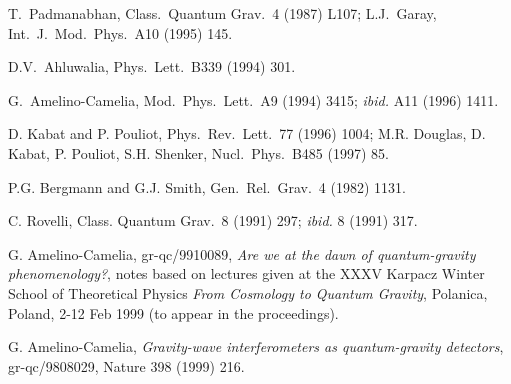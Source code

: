 \begin{thebibliography}{99}
 T.~Padmanabhan,
Class.~Quantum Grav.~4 (1987) L107;
L.J.~Garay, Int.~J.~Mod.~Phys.~A10 (1995) 145.

 D.V.~Ahluwalia, 
Phys.~Lett.~B339 (1994) 301.

G.~Amelino-Camelia,
Mod.~Phys.~Lett.~A9 (1994) 3415; {\it ibid.} A11 (1996) 1411.

 D. Kabat and P. Pouliot, 
Phys.~Rev.~Lett.~77 (1996) 1004;
M.R. Douglas, D. Kabat, P. Pouliot, S.H. Shenker,
Nucl.~Phys.~B485 (1997) 85.

 P.G. Bergmann and G.J. Smith, 
Gen.~Rel.~Grav.~4 (1982) 1131.

 C. Rovelli,
Class. Quantum Grav.~8 (1991) 297; {\it ibid.} 8 (1991) 317.

 G. Amelino-Camelia, 
gr-qc/9910089,
{\it Are we at
the dawn of quantum-gravity phenomenology?}, notes based 
on lectures given at the XXXV Karpacz Winter School of Theoretical
Physics
{\it From Cosmology to Quantum Gravity}, Polanica, Poland, 2-12
Feb 1999 (to appear in the proceedings).

 G. Amelino-Camelia, 
{\it Gravity-wave interferometers as quantum-gravity detectors},
gr-qc/9808029,
Nature {398} (1999) 216.


\end{thebibliography}


